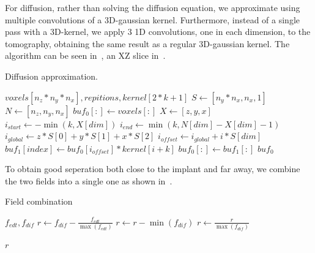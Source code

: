 For diffusion, rather than solving the diffusion equation, we approximate using multiple convolutions of a 3D-gaussian kernel.
Furthermore, instead of a single pass with a 3D-kernel, we apply 3 1D convolutions, one in each dimension, to the tomography, obtaining the same result as a regular 3D-gaussian kernel.
The algorithm can be seen in~, an XZ slice in~.

\begin{algorithm}
    \caption{Diffusion approximation.}
    \label{alg:diffusion}
    \begin{algorithmic}
         {$voxels[n_z*n_y*n_x], repitions, kernel[2*k+1]$}
            \State $S \gets [n_y * n_x, n_x, 1]$
            \State $N \gets [n_z, n_y, n_x]$
            \State $buf_0[:] \gets voxels[:]$
                        \State $X \gets [z,y,x]$
                        \State $i_{start} \gets - \min (k, X[dim])$
                        \State $i_{end} \gets \min (k, N[dim] - X[dim] - 1)$
                        \State $i_{global} \gets z*S[0] + y*S[1] + x*S[2]$
                            \State $i_{offset} \gets i_{global} + i*S[dim]$
                            \State $buf_1[index] \gets buf_0[i_{offset}] * kernel[i+k]$
                        \EndFor
                    \EndFor
                    \State $buf_0[:] \gets buf_1[:]$
                \EndFor
            \EndFor
            \Return $buf_0$
        \EndFunction
    \end{algorithmic}
\end{algorithm}

To obtain good seperation both close to the implant and far away, we combine the two fields into a single one as shown in~.

\begin{algorithm}
    \caption{Field combination}
    \label{alg:field-comb}
    \begin{algorithmic}
         {$f_{edt}, f_{dif}$}
            \State $r \gets f_{dif} - \frac{f_{edt}}{\max (f_{edt})}$
            \State $r \gets r - \min (f_{dif})$
            \State $r \gets \frac{r}{\max (f_{dif})}$

            \Return $r$
        \EndFunction
    \end{algorithmic}
\end{algorithm}

